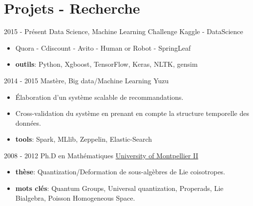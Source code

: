 \documentclass[letterpaper]{twentysecondcvfr} %
\begin{document}
\section{Projets - Recherche}{\faClipboard}
\begin{twenty}
	\twentyitem
			{2015 - }
			{Pr\'esent}
			{Data Science, Machine Learning Challenge}
			{Kaggle - DataScience}
			{}
			{\begin{itemize}
			 \item Quora - Cdiscount - Avito - Human or Robot - SpringLeaf
			 \item \textbf{outils}: Python, Xgboost, TensorFlow, Keras, NLTK, gensim
			\end{itemize}}
	\twentyitem
    	{2014 - 2015}
		{}
        {Mast\`ere, Big data/Machine Learning}
        {Yuzu}
        {}
        {\begin{itemize}
        \item \'Elaboration d'un syst\`eme scalable de recommandations.
        \item Cross-validation du syst\`eme en prenant en compte la structure temporelle des donn\'ees.
        \item \textbf{tools}: Spark, MLlib, Zeppelin, Elastic-Search
		\end{itemize}}
	\twentyitem
			{2008 - 2012}
			{}
			{Ph.D en Math\'ematiques}
			{\href{http://www.umontpellier.fr/}{University of Montpellier II}}
			{}
			{\begin{itemize}
			\item \textbf{th\`ese}: Quantization/Deformation de sous-alg\`ebres de Lie coisotropes.
			\item \textbf{mots cl\'es}: Quantum Groups, Universal quantization, Properads, Lie Bialgebra, Poisson Homogeneous Space.
			\end{itemize}}
\end{twenty}
\end{document}
